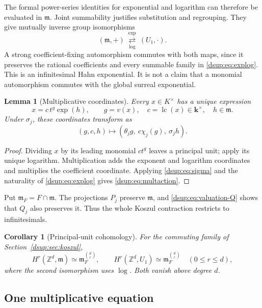 \documentclass[11pt,oneside]{article}
\numberwithin{equation}{section}
\newtheorem{lemma}[theorem]{Lemma}
\newtheorem{corollary}[theorem]{Corollary}
\theoremstyle{definition}
\theoremstyle{remark}
\newcommand{\Z}{\mathbb Z}
\newcommand{\kk}{\mathbf k}
\newcommand{\mm}{\mathfrak m}
\newcommand{\lc}{\operatorname{lc}}
\begin{document}
The formal power-series identities for exponential and logarithm can
therefore be evaluated in $\mm$. Joint summability justifies substitution
and regrouping. They give mutually inverse group isomorphisms
\[
 (\mm,+)\ \underset{\log}{\stackrel{\exp}{\rightleftarrows}}\ (U_1,\cdot).
\]
A strong coefficient-fixing automorphism commutes with both maps, since
it preserves the rational coefficients and every summable family in
\eqref{dsup:eq:explog}. This is an infinitesimal Hahn exponential. It is not a
claim that a monomial automorphism commutes with the global surreal
exponential.

\begin{lemma}[Multiplicative coordinates]\label{dsup:lem:multcoords}
Every $x\in K^\times$ has a unique expression
\begin{equation}\label{dsup:eq:multcoords}
 x=c\,t^g\exp(h),\qquad
 g=v(x),\quad c=\lc(x)\in\kk^\times,\quad h\in\mm.
\end{equation}
Under $\sigma_j$, these coordinates transform as
\begin{equation}\label{dsup:eq:multaction}
 (g,c,h)\longmapsto(\theta_jg,\ c\chi_j(g),\ \sigma_jh).
\end{equation}
\end{lemma}
\begin{proof}
Dividing $x$ by its leading monomial $ct^g$ leaves a principal unit; apply
its unique logarithm. Multiplication adds the exponent and logarithm
coordinates and multiplies the coefficient coordinate. Applying
\eqref{dsup:eq:sigma} and the naturality of \eqref{dsup:eq:explog} gives
\eqref{dsup:eq:multaction}.
\end{proof}

Put $\mm_F=F\cap\mm$. The projections $P_j$ preserve $\mm$, and
\eqref{dsup:eq:valuation-Q} shows that $Q_j$ also preserves it. Thus the whole
Koszul contraction restricts to infinitesimals.

\begin{corollary}[Principal-unit cohomology]\label{dsup:cor:unitcohom}
For the commuting family of Section~\ref{dsup:sec:koszul},
\[
 H^r(\Z^d,\mm)\simeq\mm_F^{\binom dr},\qquad
 H^r(\Z^d,U_1)\simeq\mm_F^{\binom dr}
 \quad(0\le r\le d),
\]
where the second isomorphism uses $\log$. Both vanish above degree $d$.
\end{corollary}

\subsection{One multiplicative equation}
\end{document}
